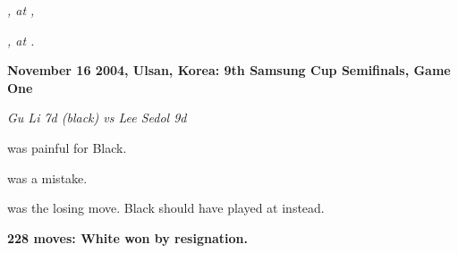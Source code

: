 \documentclass[letterpaper,12pt]{memoir}
\newcommand{\subtext}[1]{\centerline{\textit{#1}}}
\begin{document}
\subtext{{}, {\raisebox{-.17em}{\textnormal{{\gnosbi\char87}}}} at {\raisebox{-.17em}{\textnormal{{\gnosbi\char63}}}},}

\subtext{{}, {\raisebox{-.17em}{\textnormal{{\gnoswi\char90}}}} at {\raisebox{-.17em}{\textnormal{\gnosOverlap{!}{\small{2}}}}}.}

\textbf{November 16 2004, Ulsan, Korea: 9th Samsung Cup Semifinals, Game One}

\textit{Gu Li 7d (black) vs Lee Sedol 9d}

{} was painful for Black.

{} was a mistake.

{} was the losing move. Black should have played {} at {} instead.

\textbf{228 moves: White won by resignation.}


\vfill
\end{document}
